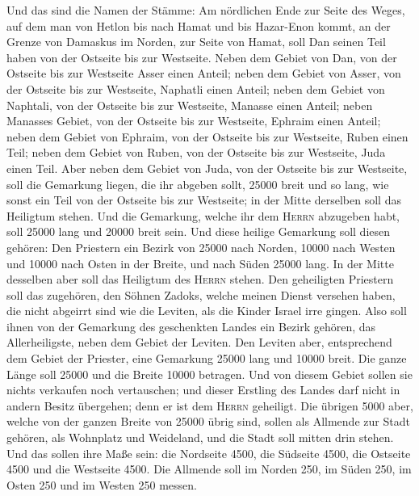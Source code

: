  Und das sind die Namen der Stämme: Am nördlichen Ende zur
Seite des Weges, auf dem man von Hetlon bis nach Hamat und bis
Hazar-Enon kommt, an der Grenze von Damaskus im Norden, zur Seite von
Hamat, soll Dan seinen Teil haben von der Ostseite bis zur Westseite.
 Neben dem Gebiet von Dan, von der Ostseite bis zur
Westseite Asser einen Anteil; neben dem Gebiet von Asser, 
von der Ostseite bis zur Westseite, Naphatli einen Anteil;
 neben dem Gebiet von Naphtali, von der Ostseite bis zur
Westseite, Manasse einen Anteil;  neben Manasses Gebiet,
von der Ostseite bis zur Westseite, Ephraim einen Anteil; 
neben dem Gebiet von Ephraim, von der Ostseite bis zur Westseite, Ruben
einen Teil;  neben dem Gebiet von Ruben, von der Ostseite
bis zur Westseite, Juda einen Teil.  Aber neben dem Gebiet
von Juda, von der Ostseite bis zur Westseite, soll die Gemarkung liegen,
die ihr abgeben sollt, 25000 breit und so lang, wie sonst ein Teil von
der Ostseite bis zur Westseite; in der Mitte derselben soll das
Heiligtum stehen.  Und die Gemarkung, welche ihr dem
\textsc{Herrn} abzugeben habt, soll 25000 lang und 20000 breit sein.
 Und diese heilige Gemarkung soll diesen gehören: Den
Priestern ein Bezirk von 25000 nach Norden, 10000 nach Westen und 10000
nach Osten in der Breite, und nach Süden 25000 lang. In der Mitte
desselben aber soll das Heiligtum des \textsc{Herrn} stehen.
 Den geheiligten Priestern soll das zugehören, den Söhnen
Zadoks, welche meinen Dienst versehen haben, die nicht abgeirrt sind wie
die Leviten, als die Kinder Israel irre gingen.  Also
soll ihnen von der Gemarkung des geschenkten Landes ein Bezirk gehören,
das Allerheiligste, neben dem Gebiet der Leviten.  Den
Leviten aber, entsprechend dem Gebiet der Priester, eine Gemarkung 25000
lang und 10000 breit. Die ganze Länge soll 25000 und die Breite 10000
betragen.  Und von diesem Gebiet sollen sie nichts
verkaufen noch vertauschen; und dieser Erstling des Landes darf nicht in
andern Besitz übergehen; denn er ist dem \textsc{Herrn} geheiligt.
 Die übrigen 5000 aber, welche von der ganzen Breite von
25000 übrig sind, sollen als Allmende zur Stadt gehören, als Wohnplatz
und Weideland, und die Stadt soll mitten drin stehen. 
Und das sollen ihre Maße sein: die Nordseite 4500, die Südseite 4500,
die Ostseite 4500 und die Westseite 4500.  Die Allmende
soll im Norden 250, im Süden 250, im Osten 250 und im Westen 250 messen.

